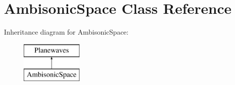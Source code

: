 \hypertarget{class_ambisonic_space}{\section{Ambisonic\-Space Class Reference}
\label{class_ambisonic_space}
}
Inheritance diagram for Ambisonic\-Space\-:\begin{figure}[H]
\begin{center}
\leavevmode
\includegraphics[height=2.000000cm]{class_ambisonic_space}
\end{center}
\end{figure}
